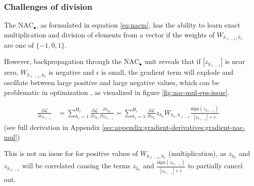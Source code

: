 \subsubsection{Challenges of division} \label{sssec:nac-mul}

The $\text{NAC}_{\bullet}$, as formulated in equation \ref{eq:nacm}, has the ability to learn exact multiplication and division of elements from a vector if the weights of $W_{h_{\ell-1},h_\ell}$ are one of $\{-1, 0, 1\}$.

However, backpropagation through the $\text{NAC}_{\bullet}$ unit reveals that if $|z_{h_{\ell-1}}|$ is near zero, $W_{h_{\ell-1},h_\ell}$ is negative and $\epsilon$ is small, the gradient term will explode and oscillate between large positive and large negative values, which can be problematic in optimization \cite{adam-optimization}, as visualized in figure \ref{fig:nac-mul-eps-issue}.

\begin{align}
\frac{\partial \mathcal{L}}{\partial z_{h_{\ell-1}}} &= \sum_{h_\ell = 1}^{H_\ell} \frac{\partial \mathcal{L}}{\partial z_{h_\ell}} \frac{\partial z_{h_\ell}}{\partial z_{h_{\ell-1}}} = \sum_{h_\ell = 1}^{H_\ell} \frac{\partial \mathcal{L}}{\partial z_{h_\ell}} z_{h_\ell} W_{h_\ell, h_{\ell-1}} \frac{\mathrm{sign}(z_{h_{\ell-1}})}{|z_{h_{\ell-1}}| + \epsilon}\label{eq:dz}
\end{align}
(see full derivation in Appendix \ref{sec:appendix:gradient-derivatives:gradient-nac-mul})

This is not an issue for for positive values of $W_{h_{\ell-1},h_\ell}$ (multiplication), as $z_{h_{\ell}}$ and $z_{h_{\ell-1}}$ will be correlated causing the terms $z_{h_\ell}$ and $\frac{\mathrm{sign}(z_{h_{\ell-1}})}{|z_{h_{\ell-1}}| + \epsilon}$ to partially cancel out.

